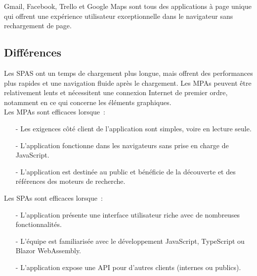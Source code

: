 Gmail, Facebook, Trello et Google Maps sont tous des applications \`a page unique qui offrent une exp\'erience utilisateur exceptionnelle dans le navigateur sans rechargement de page.


\subsection{Diff\'erences}
Les SPAS ont un temps de chargement plus longue, mais offrent des performances plus rapides et une navigation fluide apr\`es le chargement. Les MPAs peuvent \^etre relativement lents et n\'ecessitent une connexion Internet de premier ordre, notamment en ce qui concerne les \'el\'ements graphiques.\\

Les MPAs sont efficaces lorsque :
\begin{itemize}
	\item[-] Les exigences c\^ot\'e client de l'application sont simples, voire en lecture seule.
	\item[-] L'application fonctionne dans les navigateurs sans prise en charge de JavaScript.
	\item[-] L'application est destin\'ee au public et b\'en\'eficie de la d\'ecouverte et des r\'ef\'erences des moteurs de recherche.
\end{itemize}

Les SPAs sont efficaces lorsque :
\begin{itemize}
	\item[-] L'application pr\'esente une interface utilisateur riche avec de nombreuses fonctionnalit\'es.
	\item[-] L'\'equipe est familiaris\'ee avec le d\'eveloppement JavaScript, TypeScript ou Blazor WebAssembly.
	\item[-] L'application expose une API pour d'autres clients (internes ou publics).
\end{itemize}

\vspace{1cm}

